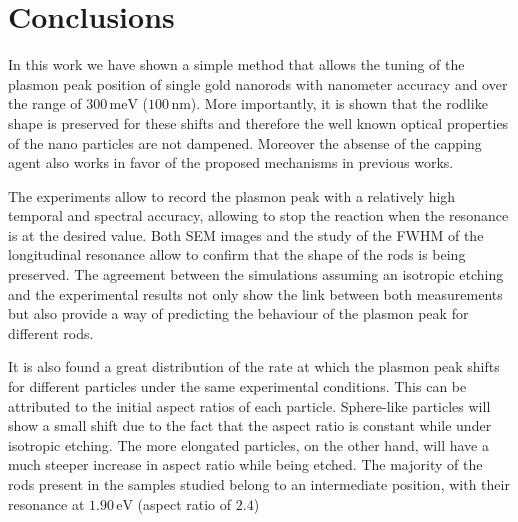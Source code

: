 \documentclass{article}
\begin{document}




\section{Conclusions}
In this work we have shown a simple method that allows the tuning of the plasmon
peak position of single gold nanorods with nanometer accuracy and over the range
of $300\,\textrm{meV}$ ($100\,\textrm{nm}$). More importantly, it is shown that
the rodlike shape is preserved for these shifts and therefore the well known
optical properties of the nano particles are not dampened. Moreover the absense
of the capping agent also works in favor of the proposed mechanisms in previous
works.

The experiments allow to record the plasmon peak with a relatively high temporal
and spectral accuracy, allowing to stop the reaction when the resonance is at
the desired value. Both SEM images and the study of the FWHM of the longitudinal
resonance allow to confirm that the shape of the rods is being preserved. The
agreement between the simulations assuming an isotropic etching and the
experimental results not only show the link between both measurements but also
provide a way of predicting the behaviour of the plasmon peak for different
rods.

It is also found a great distribution of the rate at which the plasmon peak
shifts for different particles under the same experimental conditions. This can
be attributed to the initial aspect ratios of each particle. Sphere-like
particles will show a small shift due to the fact that the aspect ratio is
constant while under isotropic etching. The more elongated particles, on the
other hand, will have a much steeper increase in aspect ratio while being
etched. The majority of the rods present in the samples studied belong to an
intermediate position, with their resonance at $1.90\,\textrm{eV}$ (aspect ratio
of $2.4$)

\end{document}
